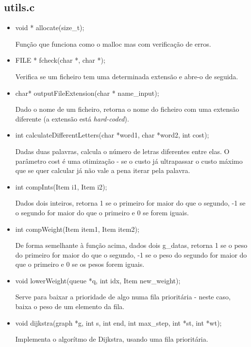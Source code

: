 \documentclass[a4paper, 11pt]{article}
\begin{document}
\subsection{utils.c}
    \begin{itemize}
    \item void * allocate(size{\_}t);
    \par Função que funciona como o malloc mas com verificação de erros.
    
    \item FILE * fcheck(char *, char *);
    \par Verifica se um ficheiro tem uma determinada extensão e abre-o de seguida.
    
    \item char* outputFileExtension(char * name{\_}input);
    \par Dado o nome de um ficheiro, retorna o nome do ficheiro com uma extensão diferente (a extensão está \textit{hard-coded}).
    
    \item int calculateDifferentLetters(char *word1, char *word2, int cost);
    \par Dadas duas palavras, calcula o número de letras diferentes entre elas. O parâmetro cost é uma otimização - se o custo já ultrapassar o custo máximo que se quer calcular já não vale a pena iterar pela palavra.
    
    \item int compInts(Item i1, Item i2);
    \par Dados dois inteiros, retorna 1 se o primeiro for maior do que o segundo, -1 se o segundo for maior do que o primeiro e 0 se forem iguais.
    
    \item int compWeight(Item item1, Item item2);
    \par De forma semelhante à função acima, dados dois g{\_}datas, retorna 1 se o peso do primeiro for maior do que o segundo, -1 se o peso do segundo for maior do que o primeiro e 0 se os pesos forem iguais.
    
    \item void lowerWeight(queue *q, int idx, Item new{\_}weight);
    \par Serve para baixar a prioridade de algo numa fila prioritária - neste caso, baixa o peso de um elemento da fila.
    
    \item void dijkstra(graph *g, int s, int end, int max{\_}step, int *st, int *wt);
    \par Implementa o algorítmo de Dijkstra, usando uma fila prioritária.
    

\end{itemize}
\end{document}
